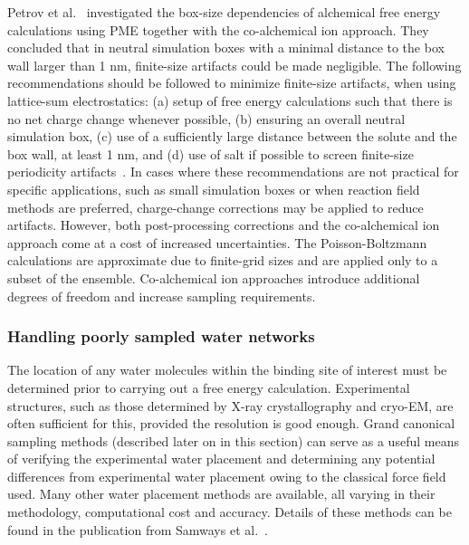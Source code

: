 \documentclass[9pt,bestpractices]{livecoms}
\begin{document}
Petrov et al.~\cite{Petrov2024guidelines} investigated the box-size dependencies of alchemical free energy calculations using PME together with the co-alchemical ion approach. They concluded that in neutral simulation boxes with a minimal distance to the box wall larger than 1 nm, finite-size artifacts could be made negligible. The following recommendations should be followed to minimize finite-size artifacts, when using lattice-sum electrostatics: (a) setup of free energy calculations such that there is no net charge change whenever possible, (b) ensuring an overall neutral simulation box, (c) use of a sufficiently large distance between the solute and the box wall, at least 1 nm, and (d) use of salt if possible to screen finite-size periodicity artifacts~\cite{chen2018accurate}. In cases where these recommendations are not practical for specific applications, such as small simulation boxes or when reaction field methods are preferred, charge-change corrections may be applied to reduce artifacts. However, both post-processing corrections and the co-alchemical ion approach come at a cost of increased uncertainties. The Poisson-Boltzmann calculations are approximate due to finite-grid sizes and are applied only to a subset of the ensemble. Co-alchemical ion approaches introduce additional degrees of freedom and increase sampling requirements.

\subsubsection{Handling poorly sampled water networks}
The location of any water molecules within the binding site of interest must be determined prior to carrying out a free energy calculation. Experimental structures, such as those determined by X-ray crystallography and cryo-EM, are often sufficient for this, provided the resolution is good enough. Grand canonical sampling methods\cite{melling2023enhanced, samways2020grand} (described later on in this section) can serve as a useful means of verifying the experimental water placement and determining any potential differences from experimental water placement owing to the classical force field used. Many other water placement methods are available, all varying in their methodology, computational cost and accuracy. Details of these methods can be found in the publication from Samways et al.~\cite{samways2021water}.
\end{document}
